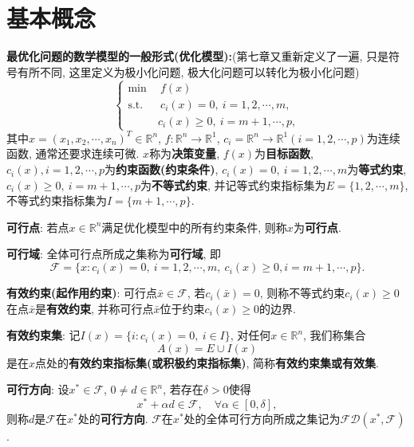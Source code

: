 \documentclass[12pt, a4paper, oneside]{ctexart}
\let\geq=\geqslant %
\def\R{\mathbb{R}}          %
\begin{document}
\section*{基本概念}
\textbf{最优化问题的数学模型的一般形式(优化模型):}(第七章又重新定义了一遍, 只是符号有所不同, 这里定义为极小化问题, 极大化问题可以转化为极小化问题)
\begin{equation*}
    \left\{\begin{aligned}
        \min &\ \ f(x)\\
        \text{s.t.}&\ \ c_i(x) = 0,\ i=1,2,\cdots, m,\\
        &\ c_i(x)\geq 0,\ i=m+1,\cdots, p,
    \end{aligned}\right.
\end{equation*}
其中$x=(x_1,x_2,\cdots, x_n)^T\in\R^n$, $f:\R^n\to\R^1$, $c_i = \R^n\to \R^1(i=1,2,\cdots, p)$为连续函数, 通常还要求连续可微. $x$称为\textbf{决策变量}, $f(x)$为\textbf{目标函数}, $c_i(x),i=1,2,\cdots, p$为\textbf{约束函数(约束条件)}, $c_i(x) = 0,\ i=1,2,\cdots, m$为\textbf{等式约束}, $c_i(x)\geq 0,\ i=m+1,\cdots, p$为\textbf{不等式约束}, 并记等式约束指标集为$E=\{1,2,\cdots, m\}$, 不等式约束指标集为$I=\{m+1,\cdots, p\}$.

\textbf{可行点}: 若点$x\in\R^n$满足优化模型中的所有约束条件, 则称$x$为\textbf{可行点}.

\textbf{可行域}: 全体可行点所成之集称为\textbf{可行域}, 即
\begin{equation*}
    \mathcal{F} = \{x:c_i(x) = 0,\ i=1,2,\cdots, m,\ c_i(x)\geq 0, i=m+1,\cdots, p\}.
\end{equation*}

\textbf{有效约束(起作用约束)}: 可行点$\bar{x}\in\mathcal{F}$, 若$c_i(\bar{x}) = 0$, 则称不等式约束$c_i(x)\geq 0$在点$\bar{x}$是\textbf{有效约束}, 并称可行点$\bar{x}$位于约束$c_i(x)\geq 0$的边界.

\textbf{有效约束集}: 记$I(x) = \{i:c_i(x) = 0,\ i\in I\}$, 对任何$x\in\R^n$, 我们称集合
\begin{equation*}
    A(x) = E\cup I(x)
\end{equation*}
是在$x$点处的\textbf{有效约束指标集(或积极约束指标集)}, 简称\textbf{有效约束集或有效集}.

\textbf{可行方向}: 设$x^*\in \mathcal{F}$, $0\neq d\in\R^n$, 若存在$\delta > 0$使得
\begin{equation*}
    x^* + \alpha d\in \mathcal{F},\quad \forall \alpha\in[0,\delta],
\end{equation*}
则称$d$是$\mathcal{F}$在$x^*$处的\textbf{可行方向}. $\mathcal{F}$在$x^*$处的全体可行方向所成之集记为$\mathcal{FD}(x^*, \mathcal{F})$.
\end{document}
